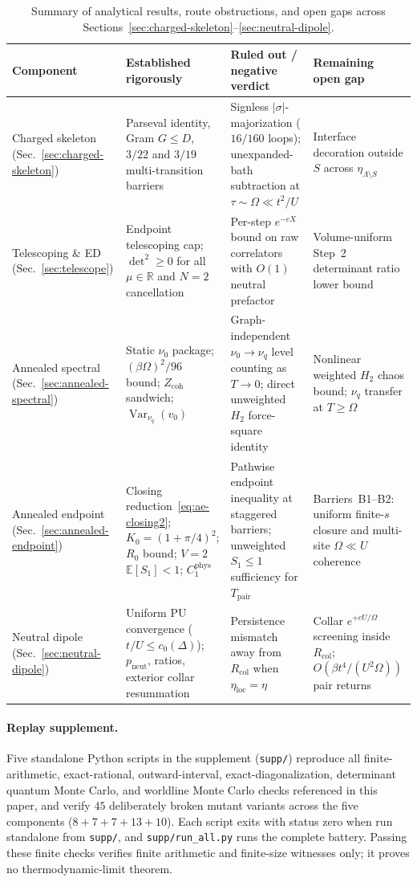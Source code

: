 \documentclass[11pt]{article}
\theoremstyle{definition}
\theoremstyle{remark}
\DeclareMathOperator{\Var}{Var}
\newcommand{\E}{\mathbb{E}}
\newcommand{\R}{\mathbb{R}}
\newcommand{\Tpair}{T_{\mathrm{pair}}}
\begin{document}
\begin{table}[t]
\centering
\caption{Summary of analytical results, route obstructions, and open gaps across Sections~\ref{sec:charged-skeleton}--\ref{sec:neutral-dipole}.}
\label{tab:scope}
\small
\begin{tabular}{@{}>{\raggedright\arraybackslash}p{2.9cm}>{\raggedright\arraybackslash}p{4.3cm}>{\raggedright\arraybackslash}p{4.1cm}>{\raggedright\arraybackslash}p{3.2cm}@{}}
\toprule
Component & Established rigorously & Ruled out / negative verdict & Remaining open gap \\
\midrule
Charged skeleton (Sec.~\ref{sec:charged-skeleton}) & Parseval identity, Gram $G \le D$, $3/22$ and $3/19$ multi-transition barriers & Signless $|\sigma|$-majorization ($16/160$ loops); unexpanded-bath subtraction at $\tau \sim \Omega \ll t^2/U$ & Interface decoration outside $S$ across $\eta_{\Lambda\setminus S}$ \\
Telescoping \& ED (Sec.~\ref{sec:telescope}) & Endpoint telescoping cap; $\det^2 \ge 0$ for all $\mu\in\R$ and $N=2$ cancellation & Per-step $e^{-cX}$ bound on raw correlators with $O(1)$ neutral prefactor & Volume-uniform Step~2 determinant ratio lower bound \\
Annealed spectral (Sec.~\ref{sec:annealed-spectral}) & Static $\nu_0$ package; $(\beta\Omega)^2/96$ bound; $Z_{\mathrm{coh}}$ sandwich; $\Var_{\nu_q}(v_0)$ & Graph-independent $\nu_0 \to \nu_q$ level counting as $T\to 0$; direct unweighted $H_2$ force-square identity & Nonlinear weighted $H_2$ chaos bound; $\nu_q$ transfer at $T \ge \Omega$ \\
Annealed endpoint (Sec.~\ref{sec:annealed-endpoint}) & Closing reduction~\eqref{eq:ae-closing2}; $K_0 = (1+\pi/4)^2$; $R_0$ bound; $V=2$ $\E[S_1]<1$; $C_1^{\mathrm{phys}}$ & Pathwise endpoint inequality at staggered barriers; unweighted $S_1 \le 1$ sufficiency for $\Tpair$ & Barriers~B1--B2: uniform finite-$s$ closure and multi-site $\Omega \ll U$ coherence \\
Neutral dipole (Sec.~\ref{sec:neutral-dipole}) & Uniform PU convergence ($t/U \le c_0(\Delta)$); $p_{\mathrm{neut}}$, ratios, exterior collar resummation & Persistence mismatch away from $R_{\mathrm{col}}$ when $\eta_{\mathrm{loc}} = \eta$ & Collar $e^{+c U/\Omega}$ screening inside $R_{\mathrm{col}}$; $O(\beta t^4/(U^2\Omega))$ pair returns \\
\bottomrule
\end{tabular}
\end{table}
\paragraph{Replay supplement.}
Five standalone Python scripts in the supplement (\texttt{supp/}) reproduce all
finite-arithmetic, exact-rational, outward-interval, exact-diagonalization,
determinant quantum Monte Carlo, and worldline Monte Carlo checks referenced in
this paper, and verify $45$ deliberately broken mutant variants across the five
components ($8+7+7+13+10$). Each script exits with status zero when run
standalone from \texttt{supp/}, and \texttt{supp/run\_all.py} runs the complete
battery. Passing these finite checks verifies finite arithmetic and finite-size
witnesses only; it proves no thermodynamic-limit theorem.
\end{document}
